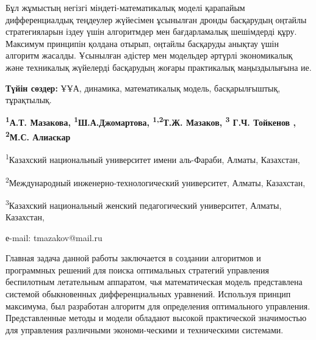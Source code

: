 Бұл жұмыстың негізгі міндеті-математикалық моделі қарапайым
дифференциалдық теңдеулер жүйесімен ұсынылған дронды басқарудың оңтайлы
стратегияларын іздеу үшін алгоритмдер мен бағдарламалық шешімдерді құру.
Максимум принципін қолдана отырып, оңтайлы басқаруды анықтау үшін
алгоритм жасалды. Ұсынылған әдістер мен модельдер әртүрлі экономикалық
және техникалық жүйелерді басқарудың жоғары практикалық маңыздылығына
ие.

{\bfseries Түйін сөздер:} ҰҰА, динамика, математикалық модель,
басқарылғыштық, тұрақтылық.


\begin{center}
{\bfseries \textsuperscript{1}А.Т. Мазакова,
\textsuperscript{1}Ш.А.Джомартова, \textsuperscript{1,2}Т.Ж.
Мазаков\envelope, \textsuperscript{3} Г.Ч. Тойкенов , \textsuperscript{2}М.С. Алиаскар}

\textsuperscript{1}Казахский национальный университет имени аль-Фараби,
Алматы, Казахстан,

\textsuperscript{2}Международный инженерно-технологический университет,
Алматы, Казахстан,

\textsuperscript{3}Казахский национальный женский педагогический
университет, Алматы, Казахстан,

е-mail: tmazakov@mail.ru
\end{center}

Главная задача данной работы заключается в создании алгоритмов и
программных решений для поиска оптимальных стратегий управления
беспилотным летательным аппаратом, чья математическая модель
представлена системой обыкновенных дифференциальных уравнений. Используя
принцип максимума, был разработан алгоритм для определения оптимального
управления. Представленные методы и модели обладают высокой практической
значимостью для управления различными экономи-ческими и техническими
системами.

